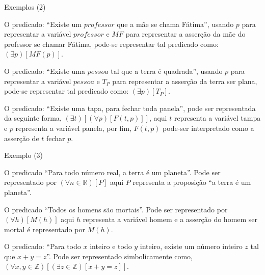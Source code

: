 \documentclass[aspectratio=169]{beamer}
\begin{document}
	\begin{frame}{Exemplos (2)}
		\begin{example}
			O predicado: ``Existe um $professor$ que a mãe se chama Fátima'', usando $p$ para representar a variável $professor$ e $MF$ para representar a asserção da mãe do professor se chamar Fátima, pode-se representar tal predicado como: $(\exists p)[MF(p)]$.
		\end{example}
		
		\begin{example}
			O predicado: ``Existe uma $pessoa$ tal que a terra é quadrada'', usando $p$ para representar a variável $pessoa$ e $T_P$ para representar a asserção da terra ser plana, pode-se representar tal predicado como: $(\exists p)[T_P]$.
		\end{example}
		
		\begin{example}
			O predicado: ``Existe uma tapa, para fechar toda panela'', pode ser representada da seguinte forma, $(\exists t)[(\forall p)[F(t, p)]]$, aqui $t$ representa a variável tampa e $p$ representa a variável panela, por fim, $F(t,p)$ pode-ser interpretado como a asserção de $t$ fechar $p$.
		\end{example}
	\end{frame}

	\begin{frame}{Exemplo (3)}
		\begin{example}
			O predicado ``Para todo número real, a terra é um planeta''. Pode ser representado por $(\forall n \in \mathbb{R})[P]$ aqui $P$ representa a proposição ``a terra é um planeta''.
		\end{example}
		
		\begin{example}
			O predicado ``Todos os homens são mortais''. Pode ser representado por $(\forall h)[M(h)]$ aqui $h$ representa a variável homem e a asserção do homem ser mortal é representado por $M(h)$.
		\end{example}
		
		\begin{example}
			O predicado: ``Para todo $x$ inteiro e todo $y$ inteiro, existe um número inteiro $z$ tal que $x + y = z$''. Pode ser representado simbolicamente como, $(\forall x, y \in \mathbb{Z})[(\exists z \in \mathbb{Z})[x+ y = z]]$.
		\end{example}
	\end{frame}
	
\end{document}

